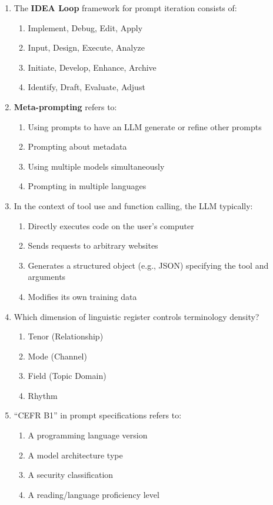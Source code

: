 \documentclass[11pt]{article}
\begin{document}
\begin{enumerate}
\item The \textbf{IDEA Loop} framework for prompt iteration consists of:
\begin{enumerate}[label=\Alph*)]
    \item Implement, Debug, Edit, Apply
    \item Input, Design, Execute, Analyze
    \item Initiate, Develop, Enhance, Archive
    \item Identify, Draft, Evaluate, Adjust
\end{enumerate}

\item \textbf{Meta-prompting} refers to:
\begin{enumerate}[label=\Alph*)]
    \item Using prompts to have an LLM generate or refine other prompts
    \item Prompting about metadata
    \item Using multiple models simultaneously
    \item Prompting in multiple languages
\end{enumerate}

\item In the context of tool use and function calling, the LLM typically:
\begin{enumerate}[label=\Alph*)]
    \item Directly executes code on the user's computer
    \item Sends requests to arbitrary websites
    \item Generates a structured object (e.g., JSON) specifying the tool and arguments
    \item Modifies its own training data
\end{enumerate}

\item Which dimension of linguistic register controls terminology density?
\begin{enumerate}[label=\Alph*)]
    \item Tenor (Relationship)
    \item Mode (Channel)
    \item Field (Topic Domain)
    \item Rhythm
\end{enumerate}

\item ``CEFR B1'' in prompt specifications refers to:
\begin{enumerate}[label=\Alph*)]
    \item A programming language version
    \item A model architecture type
    \item A security classification
    \item A reading/language proficiency level
\end{enumerate}


\end{enumerate}
\end{document}
